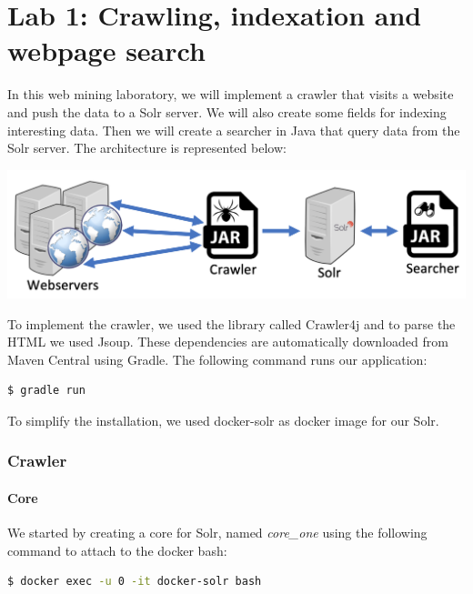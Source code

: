 \documentclass[a4paper]{article}
\begin{document}
\part*{Lab 1: Crawling, indexation and webpage search}
In this web mining laboratory, we will implement a crawler that visits a website and push the data to a Solr server. We will also create some fields for indexing interesting data. Then we will create a searcher in Java that query data from the Solr server. The architecture is represented below: \\

\begin{center}
	\includegraphics[scale=0.5]{architecture.png}
\end{center}

To implement the crawler, we used the library called Crawler4j and to parse the HTML we used Jsoup. These dependencies are automatically downloaded from Maven Central using Gradle. The following command runs our application: \\

\begin{lstlisting}[language=sh]
	$ gradle run
\end{lstlisting}

\vspace{6pt}

To simplify the installation, we used docker-solr as docker image for our Solr.

\section{Crawler}
\subsection{Core}
We started by creating a core for Solr, named \textit{core\_one} using the following command to attach to the docker bash:\\

\begin{lstlisting}[language=sh]
$ docker exec -u 0 -it docker-solr bash
\end{lstlisting}
\end{document}
